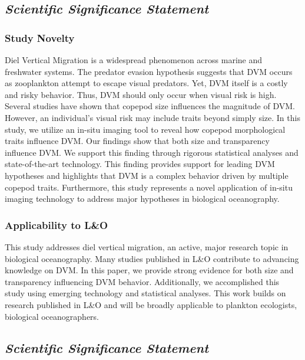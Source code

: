 \documentclass[
]{article}
\begin{document}
\hypertarget{scientific-significance-statement}{%
\subsection{\texorpdfstring{\emph{Scientific Significance
Statement}}{Scientific Significance Statement}}\label{scientific-significance-statement}}

\hypertarget{study-novelty}{%
\subsubsection{Study Novelty}\label{study-novelty}}

Diel Vertical Migration is a widespread phenomenon across marine and
freshwater systems. The predator evasion hypothesis suggests that DVM
occurs as zooplankton attempt to escape visual predators. Yet, DVM
itself is a costly and risky behavior. Thus, DVM should only occur when
visual risk is high. Several studies have shown that copepod size
influences the magnitude of DVM. However, an individual's visual risk
may include traits beyond simply size. In this study, we utilize an
in-situ imaging tool to reveal how copepod morphological traits
influence DVM. Our findings show that both size and transparency
influence DVM. We support this finding through rigorous statistical
analyses and state-of-the-art technology. This finding provides support
for leading DVM hypotheses and highlights that DVM is a complex behavior
driven by multiple copepod traits. Furthermore, this study represents a
novel application of in-situ imaging technology to address major
hypotheses in biological oceanography.

\hypertarget{applicability-to-lo}{%
\subsubsection{Applicability to L\&O}\label{applicability-to-lo}}

This study addresses diel vertical migration, an active, major research
topic in biological oceanography. Many studies published in L\&O
contribute to advancing knowledge on DVM. In this paper, we provide
strong evidence for both size and transparency influencing DVM behavior.
Additionally, we accomplished this study using emerging technology and
statistical analyses. This work builds on research published in L\&O and
will be broadly applicable to plankton ecologists, biological
oceanographers.

\hypertarget{scientific-significance-statement-1}{%
\subsection{\texorpdfstring{\emph{Scientific Significance
Statement}}{Scientific Significance Statement}}\label{scientific-significance-statement-1}}
\end{document}
